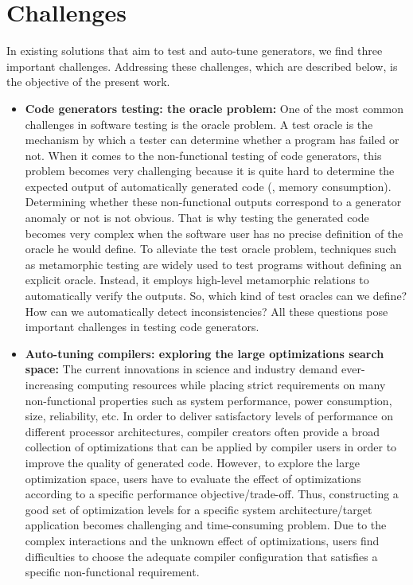 \section{Challenges}
In existing solutions that aim to test and auto-tune generators, we find three important challenges. Addressing these challenges, which are described below, is the objective of the present work.
\begin{itemize}
\item
\textbf{Code generators testing: the oracle problem:} One of the most common challenges in software testing is the oracle problem. A test oracle is the mechanism by which a tester can determine whether a program has failed or not.
When it comes to the non-functional testing of code generators, this problem becomes very challenging because it is quite hard to determine the expected output of automatically generated code (\eg, memory consumption). Determining whether these non-functional outputs correspond to a generator anomaly or not is not obvious. That is why testing the generated code becomes very complex when the software user has no precise definition of the oracle he would define. 
To alleviate the test oracle problem, techniques such as metamorphic testing\cite{chen1998metamorphic} are widely used to test programs without defining an explicit oracle. Instead, it employs high-level metamorphic relations to automatically verify the outputs.
So, which kind of test oracles can we define? How can we automatically detect inconsistencies? All these questions pose important challenges in testing code generators.


\item
\textbf{Auto-tuning compilers: exploring the large optimizations search space:} The current innovations in science and industry demand ever-increasing computing resources while placing strict requirements on many non-functional properties such as system performance, power consumption, size, reliability, etc. In order to deliver satisfactory levels of performance on different processor architectures, compiler creators often provide a broad collection of optimizations that can be applied by compiler users in order to improve the quality of generated code. However, to explore the large optimization space, users have to evaluate the effect of optimizations according to a specific performance objective/trade-off. Thus, constructing a good set of optimization levels for a specific system architecture/target application becomes challenging and time-consuming problem. Due to the complex interactions and the unknown effect of optimizations, users find difficulties to choose the adequate compiler configuration that satisfies a specific non-functional requirement.


\end{itemize}
